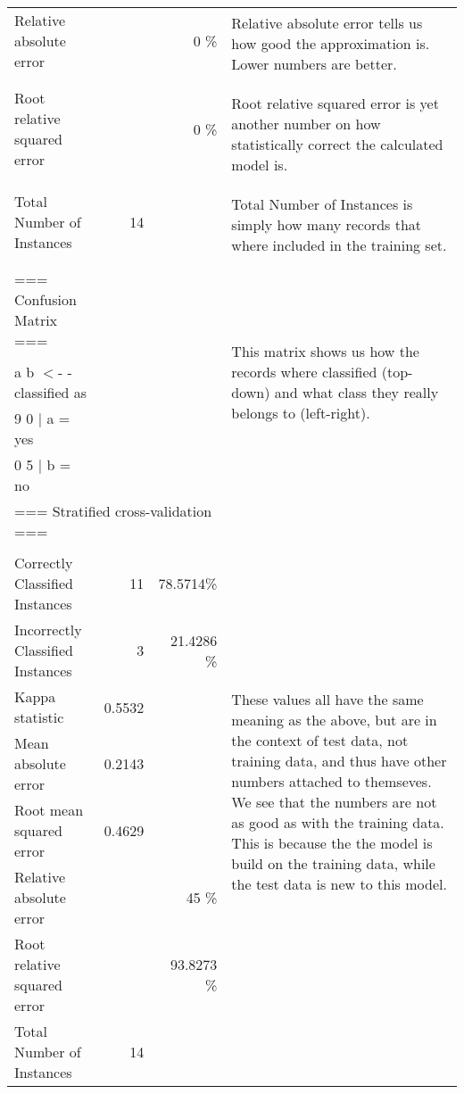 \documentclass[english,a4paper]{article}
\begin{document}
\begin{longtable}{|lrr|l|}
Relative absolute error          &&        0      \%&\multirow{2}{210pt}{
Relative absolute error tells us how good the approximation is. Lower numbers
are better. }\\
&&&\\
&&&\\
Root relative squared error      &&        0      \%&\multirow{3}{210pt}{
Root relative squared error is yet another number on how statistically correct
the calculated model is. }\\
&&&\\
&&&\\
&&&\\
Total Number of Instances        &       14  &   &\multirow{2}{210pt}{
Total Number of Instances is simply how many records that where included in the
training set. }\\
&&&\\
&&&\\
\hline
=== Confusion Matrix ===&&&\multirow{5}{210pt}{
This matrix shows us how the records where classified (top-down) and what class
they really belongs to (left-right).}\\
&&&\\
 a b   $<$- - classified as&&&\\
 9 0 $|$ a = yes&&&\\
 0 5 $|$ b = no&&&\\
 \hline
\multicolumn{3}{|l|}{=== Stratified cross-validation
===}&\multirow{10}{210pt}{These values all have the same meaning as the
above, but are in the context of test data, not training data, and thus have other
numbers attached to themseves. We see that the numbers are not as good as
with the training data. This is because the the model is build on the training
data, while the test data is new to this model. }\\
&&&\\
Correctly Classified Instances          &11       &       78.5714\%&\\
Incorrectly Classified Instances        &3        &      21.4286 \%&\\
Kappa statistic                         &0.5532&&\\
Mean absolute error                     &0.2143&&\\
Root mean squared error                 &0.4629&&\\
Relative absolute error                &&45      \%&\\
Root relative squared error            &&93.8273 \%&\\
Total Number of Instances              &14     &&\\
\hline
\end{longtable}
\end{document}
